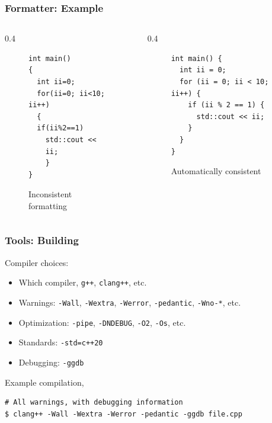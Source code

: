 \documentclass{beamer} \usetheme{Madrid}
\begin{document}
\begin{frame}[fragile]
	\frametitle{Formatter: Example}
	\begin{columns}
		\begin{column}{{0.4\textwidth}}
			\begin{figure}[H]
				\begin{verbatim}
int main()
{
  int ii=0;
  for(ii=0; ii<10; ii++)
  {
  if(ii%2==1)
    std::cout <<
	ii;
   	}
}
				\end{verbatim}
				\caption{Inconsistent formatting}
			\end{figure}
		\end{column}
		\begin{column}{{0.4\textwidth}}
			\begin{figure}[H]
				\begin{verbatim}
int main() {
  int ii = 0;
  for (ii = 0; ii < 10; ii++) {
    if (ii % 2 == 1) {
      std::cout << ii;
    }
  }
}
			\end{verbatim}
				\caption{Automatically consistent}
			\end{figure}
		\end{column}
	\end{columns}
\end{frame}

\begin{frame}[fragile]
	\frametitle{Tools: Building}
	Compiler choices:
	\begin{itemize}
		\item Which compiler, \texttt{g++}, \texttt{clang++}, etc.
		\item Warnings: \texttt{-Wall}, \texttt{-Wextra}, \texttt{-Werror}, \texttt{-pedantic}, \texttt{-Wno-*}, etc.
		\item Optimization: \texttt{-pipe}, \texttt{-DNDEBUG}, \texttt{-O2}, \texttt{-Os}, etc.
		\item Standards: \texttt{-std=c++20}
		\item Debugging: \texttt{-ggdb}
	\end{itemize}
	Example compilation,
			\begin{verbatim}
# All warnings, with debugging information
$ clang++ -Wall -Wextra -Werror -pedantic -ggdb file.cpp
			\end{verbatim}
\end{frame}
\end{document}
